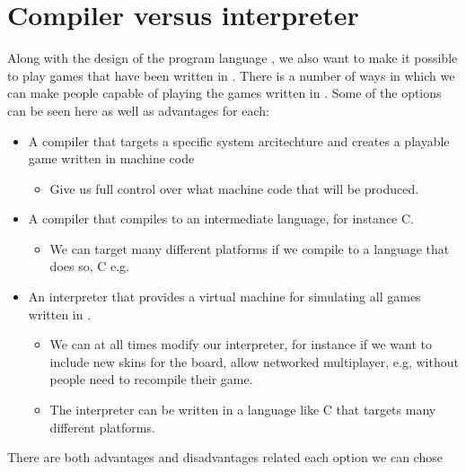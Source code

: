 \section{Compiler versus interpreter}

Along with the design of the program language \productname, we also want to make it possible to play games that have been written in \productname. There is a number of ways in which we can make people capable of playing the games written in \productname. Some of the options can be seen here as well as advantages for each:
\begin{itemize}
\item A \productname compiler that targets a specific system arcitechture and creates a playable game written in machine code
\begin{itemize}
\item Give us full control over what machine code that will be produced.
\end{itemize}
\item A \productname compiler that compiles to an intermediate language, for instance C.
\begin{itemize}
\item We can target many different platforms if we compile to a language that does so, C e.g.
\end{itemize}
\item An interpreter that provides a virtual machine for simulating all games written in \productname.
\begin{itemize}
\item We can at all times modify our interpreter, for instance if we want to include new skins for the board, allow networked multiplayer, e.g, without people need to recompile their game. 
\item The interpreter can be written in a language like C that targets many different platforms.
\end{itemize}
\end{itemize}
There are both advantages and disadvantages related each option we can chose
